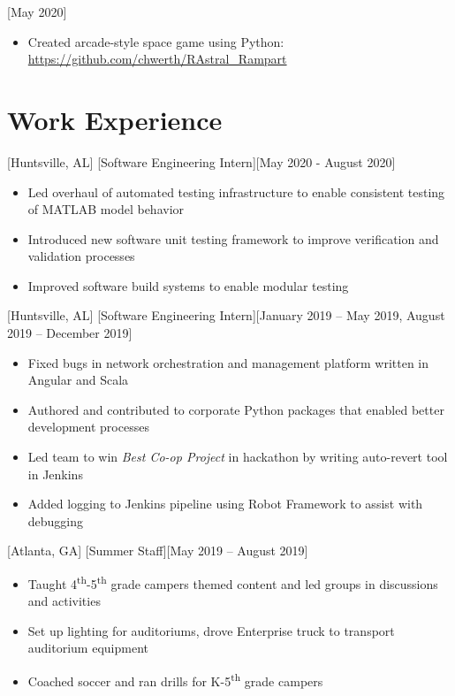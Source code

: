 \documentclass[hidelinks, 11pt]{article}
\newcommand{\link}[1]{{\color{blue}\href{#1}{#1}}}
\begin{document}
[May 2020]

\begin{itemize}
  \item Created arcade-style space game using Python: \link{https://github.com/chwerth/RAstral\_Rampart}
\end{itemize}\leavevmode

\section{Work Experience}

[Huntsville, AL]
[Software Engineering Intern][May 2020 - August 2020]

\begin{itemize}
  \item Led overhaul of automated testing infrastructure to enable consistent testing of MATLAB model behavior
  \item Introduced new software unit testing framework to improve verification and validation processes
  \item Improved software build systems to enable modular testing
\end{itemize}

[Huntsville, AL]
[Software Engineering Intern][January 2019 – May 2019, August 2019 – December 2019]

\begin{itemize}
  \item Fixed bugs in network orchestration and management platform written in Angular and Scala
  \item Authored and contributed to corporate Python packages that enabled better development processes
  \item Led team to win \textit{Best Co-op Project} in hackathon by writing auto-revert tool in Jenkins
  \item Added logging to Jenkins pipeline using Robot Framework to assist with debugging
\end{itemize}

[Atlanta, GA]
[Summer Staff][May 2019 – August 2019]

\begin{itemize}
  \item Taught 4\textsuperscript{th}-5\textsuperscript{th} grade campers themed content and led groups in discussions and activities
  \item Set up lighting for auditoriums, drove Enterprise truck to transport auditorium equipment
  \item Coached soccer and ran drills for K-5\textsuperscript{th} grade campers
\end{itemize}
\end{document}

